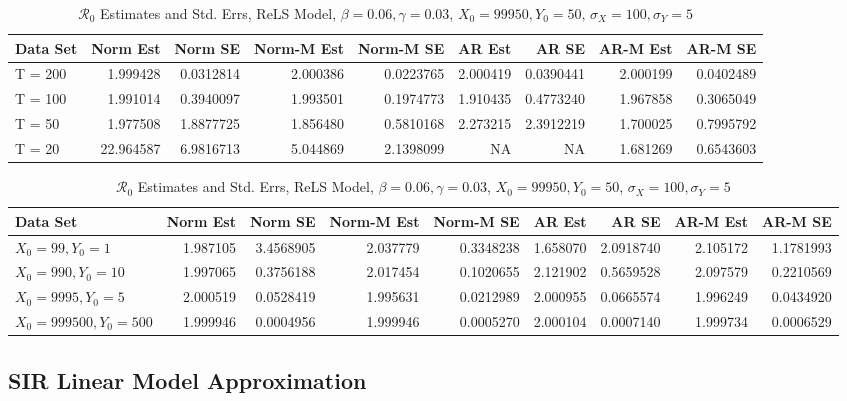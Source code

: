 \documentclass[12pt]{article}
\newcommand{\rr}{\ensuremath{\mathcal{R}_0}}
\begin{document}
\begin{table}[H]
	
	\caption{\label{tab:}$\rr$ Estimates and Std. Errs, ReLS Model,
		$\beta = 0.06, \gamma = 0.03$, $X_0 = 99950, Y_0 = 50$, $\sigma_X = 100, \sigma_Y = 5$}
	\centering
	\begin{tabular}[t]{l|r|r|r|r|r|r|r|r}
		\hline
		Data Set & Norm Est & Norm SE & Norm-M Est & Norm-M SE & AR Est & AR SE & AR-M Est & AR-M SE\\
		\hline
		T = 200 & 1.999428 & 0.0312814 & 2.000386 & 0.0223765 & 2.000419 & 0.0390441 & 2.000199 & 0.0402489\\
		\hline
		T = 100 & 1.991014 & 0.3940097 & 1.993501 & 0.1974773 & 1.910435 & 0.4773240 & 1.967858 & 0.3065049\\
		\hline
		T = 50 & 1.977508 & 1.8877725 & 1.856480 & 0.5810168 & 2.273215 & 2.3912219 & 1.700025 & 0.7995792\\
		\hline
		T = 20 & 22.964587 & 6.9816713 & 5.044869 & 2.1398099 & NA & NA & 1.681269 & 0.6543603\\
		\hline
	\end{tabular}
\end{table}

\begin{table}[H]
	
	\caption{\label{tab:}$\rr$ Estimates and Std. Errs, ReLS Model,
		$\beta = 0.06, \gamma = 0.03$, $X_0 = 99950, Y_0 = 50$, $\sigma_X = 100, \sigma_Y = 5$}
	\centering
	\begin{tabular}[t]{l|r|r|r|r|r|r|r|r}
		\hline
		Data Set & Norm Est & Norm SE & Norm-M Est & Norm-M SE & AR Est & AR SE & AR-M Est & AR-M SE\\
		\hline
		$X_0 = 99, Y_0 = 1$ & 1.987105 & 3.4568905 & 2.037779 & 0.3348238 & 1.658070 & 2.0918740 & 2.105172 & 1.1781993\\
		\hline
		$X_0 = 990, Y_0 = 10$ & 1.997065 & 0.3756188 & 2.017454 & 0.1020655 & 2.121902 & 0.5659528 & 2.097579 & 0.2210569\\
		\hline
		$X_0 = 9995, Y_0 = 5$ & 2.000519 & 0.0528419 & 1.995631 & 0.0212989 & 2.000955 & 0.0665574 & 1.996249 & 0.0434920\\
		\hline
		$X_0 = 999500, Y_0 = 500$ & 1.999946 & 0.0004956 & 1.999946 & 0.0005270 & 2.000104 & 0.0007140 & 1.999734 & 0.0006529\\
		\hline
	\end{tabular}
\end{table}

\subsection{SIR Linear Model Approximation}
\end{document}
